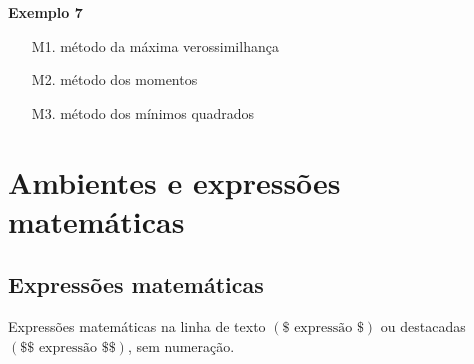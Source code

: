 \documentclass[12pt]{article}
\begin{document}
\noindent \textbf{Exemplo 7}
\begin{itemize}
    \item[M1.] método da máxima verossimilhança
    \item[M2.] método dos momentos
    \item[M3.] método dos mínimos quadrados
\end{itemize}

\newpage 

\section{Ambientes e expressões matemáticas}

\subsection{Expressões matemáticas}
Expressões matemáticas na linha de texto $(\$\mbox{ expressão }\$)$ ou destacadas $(\$\$\mbox{ expressão }\$\$)$, sem numeração.
\end{document}
